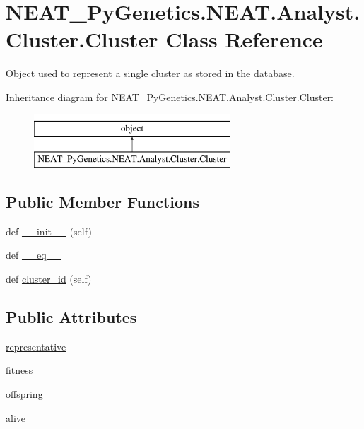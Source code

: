 \hypertarget{classNEAT__PyGenetics_1_1NEAT_1_1Analyst_1_1Cluster_1_1Cluster}{}\section{N\+E\+A\+T\+\_\+\+Py\+Genetics.\+N\+E\+A\+T.\+Analyst.\+Cluster.\+Cluster Class Reference}
\label{classNEAT__PyGenetics_1_1NEAT_1_1Analyst_1_1Cluster_1_1Cluster}


Object used to represent a single cluster as stored in the database.  


Inheritance diagram for N\+E\+A\+T\+\_\+\+Py\+Genetics.\+N\+E\+A\+T.\+Analyst.\+Cluster.\+Cluster\+:\begin{figure}[H]
\begin{center}
\leavevmode
\includegraphics[height=2.000000cm]{classNEAT__PyGenetics_1_1NEAT_1_1Analyst_1_1Cluster_1_1Cluster}
\end{center}
\end{figure}
\subsection*{Public Member Functions}
\begin{DoxyCompactItemize}
\item 
def \hyperlink{classNEAT__PyGenetics_1_1NEAT_1_1Analyst_1_1Cluster_1_1Cluster_a12ebc01de1535941e1af477dddaedbe9}{\+\_\+\+\_\+init\+\_\+\+\_\+} (self)
\item 
def \hyperlink{classNEAT__PyGenetics_1_1NEAT_1_1Analyst_1_1Cluster_1_1Cluster_a85d2dfa24ff6846be17920a77987ece5}{\+\_\+\+\_\+eq\+\_\+\+\_\+}
\item 
def \hyperlink{classNEAT__PyGenetics_1_1NEAT_1_1Analyst_1_1Cluster_1_1Cluster_a691632bc1747f486a4f1c8fe3ee02265}{cluster\+\_\+id} (self)
\end{DoxyCompactItemize}
\subsection*{Public Attributes}
\begin{DoxyCompactItemize}
\item 
\hyperlink{classNEAT__PyGenetics_1_1NEAT_1_1Analyst_1_1Cluster_1_1Cluster_a6d98b217b836b08679f9b20f9459f2ba}{representative}
\item 
\hyperlink{classNEAT__PyGenetics_1_1NEAT_1_1Analyst_1_1Cluster_1_1Cluster_a1c956f56f9f8e92391eb6c8912d8cd8a}{fitness}
\item 
\hyperlink{classNEAT__PyGenetics_1_1NEAT_1_1Analyst_1_1Cluster_1_1Cluster_a29316a5b5546bea6c97896e814ce084e}{offspring}
\item 
\hyperlink{classNEAT__PyGenetics_1_1NEAT_1_1Analyst_1_1Cluster_1_1Cluster_a9d814ccf011d42ab14bdade4be3e1fdb}{alive}
\end{DoxyCompactItemize}


